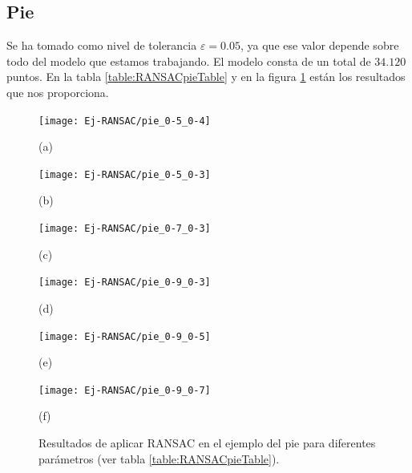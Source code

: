 \subsection{Pie}
Se ha tomado como nivel de tolerancia $ \varepsilon = 0.05 $, ya que ese valor depende sobre todo del modelo que estamos trabajando. El modelo consta de un total de $ 34.120 $ puntos. En la tabla \ref{table:RANSACpieTable} y en la figura \ref{fig:RANSACpie} están los resultados que nos proporciona. \\

\begin{figure}[h!]
	\begin{minipage}[b]{0.5\textwidth}
		\centering
		\texttt{[image: Ej-RANSAC/pie\_0-5\_0-4]} 
		\caption*{(a)}
	\end{minipage}
	\begin{minipage}[b]{0.5\textwidth}
		\centering
		\texttt{[image: Ej-RANSAC/pie\_0-5\_0-3]} 
		\caption*{(b)}
	\end{minipage}
	\begin{minipage}[b]{0.5\textwidth}
		\centering
		\texttt{[image: Ej-RANSAC/pie\_0-7\_0-3]} 
		\caption*{(c)}
	\end{minipage}
	\begin{minipage}[b]{0.5\textwidth}
		\centering
		\texttt{[image: Ej-RANSAC/pie\_0-9\_0-3]} 
		\caption*{(d)}
	\end{minipage}		
	\begin{minipage}[b]{0.5\textwidth}
		\centering
		\texttt{[image: Ej-RANSAC/pie\_0-9\_0-5]} 
		\caption*{(e)}
	\end{minipage}
	\begin{minipage}[b]{0.5\textwidth}
		\centering
		\texttt{[image: Ej-RANSAC/pie\_0-9\_0-7]} 
		\caption*{(f)}
	\end{minipage}	
	
	\caption{Resultados de aplicar RANSAC en el ejemplo del pie para diferentes parámetros (ver tabla \ref{table:RANSACpieTable}). }
	\label{fig:RANSACpie}
\end{figure}

